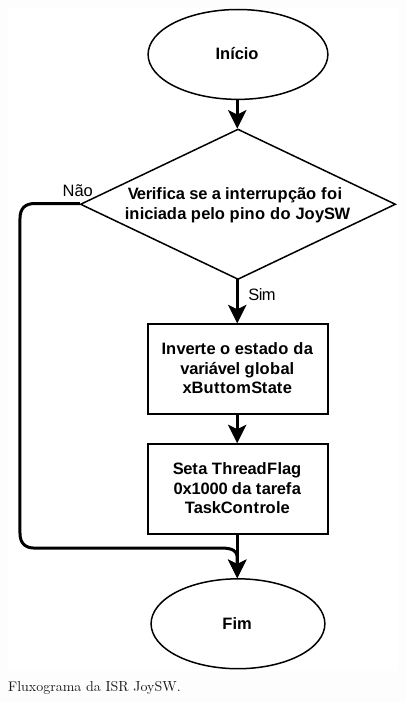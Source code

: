 \begin{figure}[H]
	\centering
	\includegraphics[height= 0.35\textheight]{img/fluxograma_joysw}
	\caption{Fluxograma da ISR JoySW.}
	\label{fig:fluxograma_joysw}
\end{figure}


